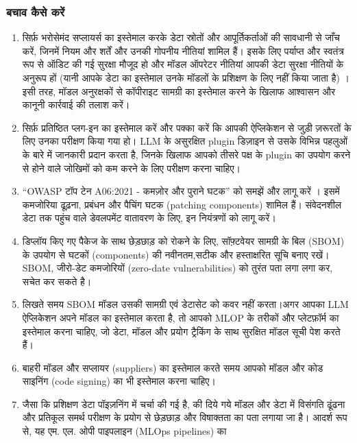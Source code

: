 \documentclass[
]{article}
\providecommand{\tightlist}{%
  \setlength{\itemsep}{0pt}\setlength{\parskip}{0pt}}
\begin{document}
\subsubsection{बचाव कैसे करें}\label{ux92cux91aux935-ux915ux938-ux915ux930}

\begin{enumerate}
\def\labelenumi{\arabic{enumi}.}
\tightlist
\item
  सिर्फ़ भरोसेमंद सप्लायर्स का इस्तेमाल करके डेटा स्रोतों और आपूर्तिकर्ताओं की सावधानी से
  जाँच करें, जिनमें नियम और शर्तें और उनकी गोपनीय नीतियां शामिल हैं। इसके लिए पर्याप्त
  और स्वतंत्र रूप से ऑडिट की गई सुरक्षा मौजूद हो और मॉडल ऑपरेटर नीतियां आपकी डेटा
  सुरक्षा नीतियों के अनुरूप हों (यानी आपके डेटा का इस्तेमाल उनके मॉडलों के प्रशिक्षण के
  लिए नहीं किया जाता है) । इसी तरह, मॉडल अनुरक्षकों से कॉपीराइट सामग्री का
  इस्तेमाल करने के खिलाफ आश्वासन और कानूनी कार्रवाई की तलाश करें।
\item
  सिर्फ़ प्रतिष्ठित प्लग-इन का इस्तेमाल करें और पक्का करें कि आपकी ऐप्लिकेशन से जुड़ी
  ज़रूरतों के लिए उनका परीक्षण किया गया हो। LLM के असुरक्षित plugin डिज़ाइन से उसके
  विभिन्न पहलुओं के बारे में जानकारी प्रदान करता है, जिनके खिलाफ आपको तीसरे पक्ष के
  plugin का उपयोग करने से होने वाले जोखिमों को कम करने के लिए परीक्षण करना
  चाहिए।
\item
  ``OWASP टॉप टेन A06:2021 - कमज़ोर और पुराने घटक'' को समझें और लागू करें । इसमें
  कमजोरिया ढूढ़ना, प्रबंधन और पैचिंग घटक (patching components) शामिल हैं।
  संवेदनशील डेटा तक पहुंच वाले डेवलपमेंट वातावरण के लिए, इन नियंत्रणों को लागू करें।
\item
  डिप्लॉय किए गए पैकेज के साथ छेड़छाड़ को रोकने के लिए, सॉफ़्टवेयर सामग्री के बिल
  (SBOM) के उपयोग से घटकों (components) की नवीनतम,सटीक और हस्ताक्षरित सूचि
  बनाए रखें। SBOM, जीरो-डेट कमजोरियों (zero-date vulnerabilities) को तुरंत पता
  लगा लगा कर, सचेत कर सकते है।
\item
  लिखते समय SBOM मॉडल उसकी सामग्री एवं डेटासेट को कवर नहीं करता।अगर आपका LLM
  ऐप्लिकेशन अपने मॉडल का इस्तेमाल करता है, तो आपको MLOP के तरीकों और प्लेटफ़ॉर्म का
  इस्तेमाल करना चाहिए, जो डेटा, मॉडल और प्रयोग ट्रैकिंग के साथ सुरक्षित मॉडल सूची
  पेश करते हैं।
\item
  बाहरी मॉडल और सप्लायर (suppliers) का इस्तेमाल करते समय आपको मॉडल और कोड
  साइनिंग (code signing) का भी इस्तेमाल करना चाहिए।
\item
  जैसा कि प्रशिक्षण डेटा पॉइज़निंग में चर्चा की गई है, की दिये गये मॉडल और डेटा में
  विसंगति ढूंढना और प्रतिकूल समर्थ परीक्षण के प्रयोग से छेड़छाड़ और विषाक्तता का पता
  लगाया जा है। आदर्श रूप से, यह एम. एल. ओपी पाइपलाइन (MLOps pipelines) का

\end{enumerate}
\end{document}
